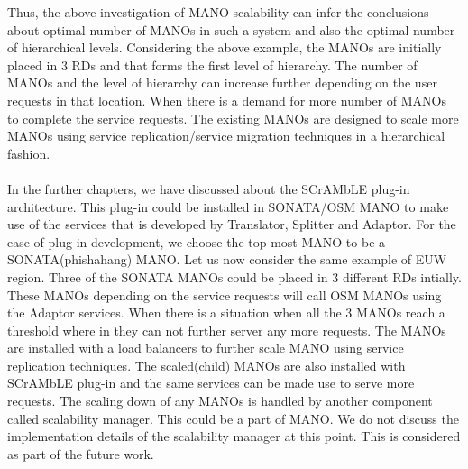 Thus, the above investigation of MANO scalability can infer the conclusions about optimal number of MANOs in such a system and also the optimal number of hierarchical levels. Considering the above example, the MANOs are initially placed in 3 RDs and that forms the first level of hierarchy. The number of MANOs and the level of hierarchy can increase further depending on the user requests in that location. When there is a demand for more number of MANOs to complete the service requests. The existing MANOs are designed to scale more MANOs using service replication/service migration techniques in a hierarchical fashion. 

\paragraph{}In the further chapters, we have discussed about the SCrAMbLE plug-in architecture. This plug-in could be installed in SONATA/OSM MANO to make use of the services that is developed by Translator, Splitter and Adaptor. For the ease of plug-in development, we choose the top most MANO to be a SONATA(phishahang) MANO. Let us now consider the same example of EUW region. Three of the SONATA MANOs could be placed in 3 different RDs intially. These MANOs depending on the service requests will call OSM MANOs using the Adaptor services. When there is a situation when all the 3 MANOs reach a threshold where in they can not further server any more requests. The MANOs are installed with a load balancers to further scale MANO using service replication techniques. The scaled(child) MANOs are also installed with SCrAMbLE plug-in and the same services can be made use to serve more requests. 
The scaling down of any MANOs is handled by another component called scalability manager. This could be a part of MANO. We do not discuss the implementation details of the scalability manager at this point. This is considered as part of the future work. 
